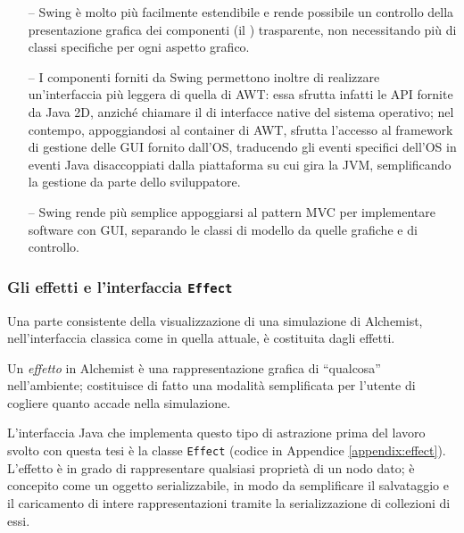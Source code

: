                 \begin{itemize}
                    \item[--] Swing è molto più facilmente estendibile e rende possibile un controllo della presentazione grafica dei componenti (il ) trasparente, non necessitando più di classi specifiche per ogni aspetto grafico.

                    \item[--] I componenti forniti da Swing permettono inoltre di realizzare un'interfaccia più leggera di quella di AWT: essa sfrutta infatti le API fornite da Java 2D, anziché chiamare il  di interfacce native del sistema operativo; nel contempo, appoggiandosi al container di AWT, sfrutta l'accesso al framework di gestione delle GUI fornito dall'OS, traducendo gli eventi specifici dell'OS in eventi Java disaccoppiati dalla piattaforma su cui gira la JVM, semplificando la gestione da parte dello sviluppatore.

                    \item[--] Swing rende più semplice appoggiarsi al pattern MVC per implementare software con GUI, separando le classi di modello da quelle grafiche e di controllo.

                \end{itemize}

            \subsubsection{Gli effetti e l'interfaccia \texttt{Effect}}\label{subsub:effect}
                Una parte consistente della visualizzazione di una simulazione di Alchemist, nell'interfaccia classica come in quella attuale, è costituita dagli effetti.

                Un \emph{effetto} in Alchemist è una rappresentazione grafica di ``qualcosa'' nell'ambiente; costituisce di fatto una modalità semplificata per l'utente di cogliere quanto accade nella simulazione.

                L'interfaccia Java che implementa questo tipo di astrazione prima del lavoro svolto con questa tesi è la classe \texttt{Effect} (codice in Appendice \ref{appendix:effect}).
                L'effetto è in grado di rappresentare qualsiasi proprietà di un nodo dato; è concepito come un oggetto serializzabile, in modo da semplificare il salvataggio e il caricamento di intere rappresentazioni tramite la serializzazione di collezioni di essi.

